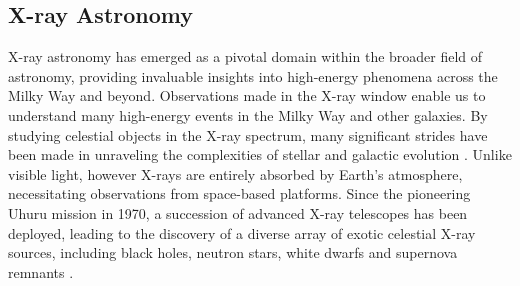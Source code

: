         \subsection{X-ray Astronomy} \label{introduction:introduction:x-ray-astro}
        	X-ray astronomy has emerged as a pivotal domain within the broader field of astronomy, providing invaluable insights into high-energy phenomena across the Milky Way and beyond. Observations made in the X-ray window enable us to understand many high-energy events in the Milky Way and other galaxies. By studying celestial objects in the X-ray spectrum, many significant strides have been made in unraveling the complexities of stellar and galactic evolution \cite{giacconi1962evidence}. Unlike visible light, however X-rays are entirely absorbed by Earth's atmosphere, necessitating observations from space-based platforms. Since the pioneering Uhuru mission in 1970, a succession of advanced X-ray telescopes has been deployed, leading to the discovery of a diverse array of exotic celestial X-ray sources, including black holes, neutron stars, white dwarfs and supernova remnants \cite{tanaka1996x}.
        	
